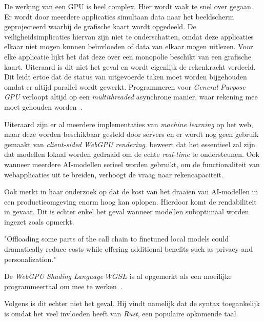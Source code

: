 \bigbreak{}

De werking van een GPU is heel complex. Hier wordt vaak te snel over gegaan. Er wordt door meerdere applicaties simultaan data naar het beeldscherm geprojecteerd waarbij de grafische kaart wordt opgedeeld. De veiligheidsimplicaties hiervan zijn niet te onderschatten, omdat deze applicaties elkaar niet mogen kunnen beïnvloeden of data van elkaar mogen uitlezen. Voor elke applicatie lijkt het dat deze over een monopolie beschikt van een grafische kaart. Uiteraard is dit niet het geval en wordt eigenlijk de rekenkracht verdeeld. Dit leidt ertoe dat de status van uitgevoerde taken moet worden bijgehouden omdat er altijd parallel wordt gewerkt. Programmeren voor \textit{General Purpose GPU} verloopt altijd op een \textit{multithreaded} asynchrone manier, waar rekening mee moet gehouden worden~\autocite{Surma2022}.

\bigbreak{}

Uiteraard zijn er al meerdere implementaties van \textit{machine learning} op het web, maar deze worden beschikbaar gesteld door servers en er wordt nog geen gebruik gemaakt van \textit{client-sided \textit{WebGPU} rendering}. \textcite{Fleetwood2023a} beweert dat het essentieel zal zijn dat modellen lokaal worden gedraaid om de echte \textit{real-time} te ondersteunen. Ook wanneer meerdere AI-modellen serieel worden gebruikt, om de functionaliteit van webapplicaties uit te breiden, verhoogt de vraag naar rekencapaciteit.

\bigbreak{}

Ook \textcite{Huyen2023} merkt in haar onderzoek op dat de kost van het draaien van AI-modellen in een productieomgeving enorm hoog kan oplopen. Hierdoor komt de rendabiliteit in gevaar. Dit is echter enkel het geval wanneer modellen suboptimaal worden ingezet zoals \textcite{Fleetwood2023a} opmerkt.

\begin{displayquote}
    "Offloading some parts of the call chain to finetuned local models could dramatically reduce costs while offering additional benefits such as privacy and personalization."
\end{displayquote}

\bigbreak{}

De \textit{WebGPU Shading Language} \(\textit{WGSL}\) \autocite{W3C2024} is al opgemerkt als een moeilijke programmeertaal om mee te werken~\autocite{Madrigal2023, Ashton2020}.

Volgens \textcite{Fleetwood2023a} is dit echter niet het geval. Hij vindt namelijk dat de syntax toegankelijk is omdat het veel invloeden heeft van \textit{Rust}, een populaire opkomende taal.

